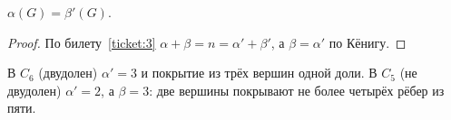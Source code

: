 \begin{cor}
\(\alpha(G)=\beta'(G)\).
\end{cor}
\begin{proof}
По билету~\ref{ticket:3} \(\alpha+\beta=n=\alpha'+\beta'\), а \(\beta=\alpha'\) по Кёнигу.
\end{proof}
\begin{example}
В \(C_6\) (двудолен) \(\alpha'=3\) и покрытие из трёх вершин одной доли.
В \(C_5\) (не двудолен) \(\alpha'=2\), а \(\beta=3\): две вершины покрывают
не более четырёх рёбер из пяти.
\end{example}
